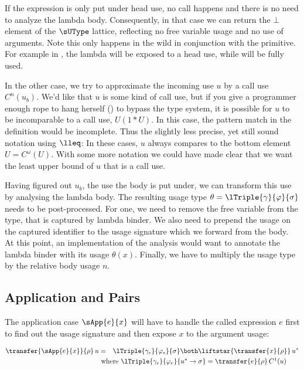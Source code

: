 If the expression is only put under head use, no call happens and there is no need to analyze the lambda body.
Consequently, in that case we can return the $\bot$ element of the $\sUType$ lattice, reflecting no free variable usage and no use of arguments.
Note this only happens in the wild in conjunction with the  primitive. 
For example in , the lambda will be exposed to a head use, while  will be fully used.

In the other case, we try to approximate the incoming use $u$ by a call use $C^n(u_b)$. 
We'd like that $u$ is some kind of call use, but if you give a programmer enough rope to hang herself (\eg {}) to bypass the type system, it is possible for $u$ to be incomparable to a call use, \ie $U(1*U)$. 
In this case, the pattern match in the definition would be incomplete.
Thus the slightly less precise, yet still sound notation using $\lleq$: 
In these cases, $u$ always compares to the bottom element $U=C^\omega(U)$.
With some more notation we could have made clear that we want the least upper bound of $u$ that is a call use.

Having figured out $u_b$, the use the body is put under, we can transform this use by analysing the lambda body.
The resulting usage type $\theta=\lTriple{\gamma}{\varphi}{\sigma}$ needs to be post-processed. 
For one, we need to remove the free variable  from the type, that is captured by lambda binder.
We also need to prepend the usage on the captured identifier to the usage signature which we forward from the body.
At this point, an implementation of the analysis would want to annotate the lambda binder with its usage $\theta(x)$.
Finally, we have to multiply the usage type by the relative body usage $n$.

\subsection{Application and Pairs}\label{sec:app}

The application case $\sApp{e}{x}$ will have to handle the called expression $e$ first to find out the usage signature and then expose $x$ to the argument usage:

\begin{alignat*}{2}
  \transfer{\sApp{e}{x}}{\rho}\,u &=&& \lTriple{\gamma_e}{\varphi_e}{\sigma} \both \liftstar{\transfer{x}{\rho}}\,u^* \\
  &\rlap{ where $\lTriple{\gamma_e}{\varphi_e}{u^* \to \sigma} = \transfer{e}{\rho}\,C^1(u)$} &&\\
\end{alignat*}

